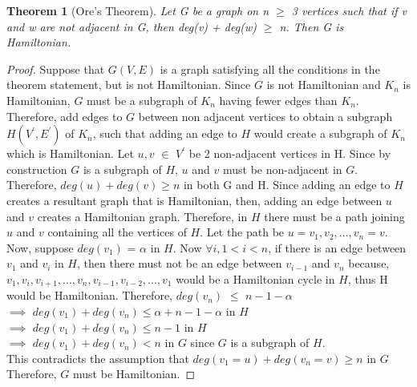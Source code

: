 \documentclass[12pt]{article}
\newtheorem{theorem}[definition]{Theorem}
\numberwithin{equation}{subsection}
\numberwithin{table}{subsection}
\numberwithin{algorithm}{subsection}
\begin{document}
\begin{theorem}[Ore's Theorem]
\label{ore's theorem}
Let G be a graph on n $\geq$ 3 vertices such that if v and w are not adjacent in G, then deg(v) + deg(w) $\geq$ n. Then G is Hamiltonian. {}
\end{theorem}
\begin{proof}
Suppose that $\mathit{G(V,E)}$ is a graph satisfying all the conditions in the theorem statement, but is not Hamiltonian. Since $\mathit{G}$ is not Hamiltonian and $K_n$ is Hamiltonian, $\mathit{G}$ must be a subgraph of $\mathit{K_n}$ having fewer edges than $\mathit{K_n}$. Therefore, add edges to $\mathit{G}$ between non adjacent vertices to obtain a subgraph $\mathit{H(V^\prime,E^\prime)}$ of $\mathit{K_n}$, such that adding an edge to $\mathit{H}$ would create a subgraph of $\mathit{K_n}$ which is Hamiltonian. Let $\mathit{u, v}$ $\in$ $V^\prime$ be 2 non-adjacent vertices in H. Since by construction $\mathit{G}$ is a subgraph of $\mathit{H}$, $u$ and $v$ must be non-adjacent in $\mathit{G}$. Therefore, $\mathit{deg(u) + deg(v) \geq n}$ in both G and H. Since adding an edge to $\mathit{H}$ creates a resultant graph that is Hamiltonian, then, adding an edge between $\mathit{u}$ and $\mathit{v}$ creates a Hamiltonian graph. Therefore, in $\mathit{H}$ there must be a path joining $\mathit{u}$ and $\mathit{v}$ containing all the vertices of $\mathit{H}$. Let the path be $\mathit{u = v_1, v_2, ..., v_n = v}$.\\
Now, suppose $\mathit{deg(v_1)}$ = $\alpha$ in $\mathit{H}$. Now $\forall \mathit{i}, 1 <  i < \mathit{n}$, if there is an edge between $\mathit{v_1}$ and $\mathit{v_i}$ in $\mathit{H}$, then there must not be an edge between $\mathit{v_{i-1}}$ and $\mathit{v_n}$ because, $\mathit{v_1, v_i, v_{i+1}, ..., v_n, v_{i-1}, v_{i-2}, ..., v_1}$ would be a Hamiltonian cycle in $\mathit{H}$, thus H would be Hamiltonian. Therefore, $\mathit{deg(v_n)}$ $\leq$ $\mathit{n-1-\alpha}$\\
$\implies$ $\mathit{deg(v_1) + deg(v_n) \leq \alpha +  n-1 - \alpha}$ in $\mathit{H}$\\
$\implies$ $\mathit{deg(v_1) + deg(v_n) \leq n-1}$ in $\mathit{H}$\\
$\implies$ $\mathit{deg(v_1) + deg(v_n) < n}$ in $\mathit{G}$ since $\mathit{G}$ is a subgraph of $\mathit{H}$.\\
This contradicts the assumption that $\mathit{deg(v_1 = u) + deg(v_n = v) \geq n}$ in $\mathit{G}$ \\
Therefore, $\mathit{G}$ must be Hamiltonian.
\end{proof}
\end{document}
